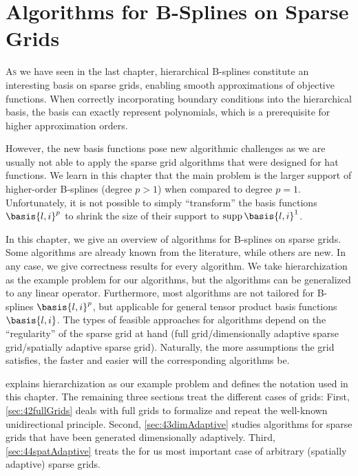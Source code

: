 
\chapter{Algorithms for B-Splines on Sparse Grids}



\lettrine{A}{s} we have seen in the last chapter,
hierarchical B-splines constitute an interesting basis on sparse grids,
enabling smooth approximations of objective functions.
When correctly incorporating boundary conditions into the hierarchical basis,
the basis can exactly represent polynomials,
which is a prerequisite for higher approximation orders.

However, the new basis functions pose new algorithmic challenges
as we are usually not able to apply the sparse grid algorithms
that were designed for hat functions.
We learn in this chapter that the main problem is the larger support
of higher-order B-splines (degree $p > 1$) when compared to degree $p = 1$.
Unfortunately, it is not possible to simply ``transform'' the basis
functions $\basis{l,i}^p$ to shrink the size of their support
to $\supp \basis{l,i}^1$.

In this chapter, we give an overview of algorithms for B-splines
on sparse grids.
Some algorithms are already known from the literature,
while others are new.
In any case, we give correctness results for every algorithm.
We take hierarchization as the example problem for our algorithms,
but the algorithms can be generalized to any linear operator.
Furthermore, most algorithms are not tailored for B-splines $\basis{l,i}^p$,
but applicable for general tensor product basis functions $\basis{l,i}$.
The types of feasible approaches for algorithms
depend on the ``regularity'' of the sparse grid at hand
(full grid/dimensionally adaptive sparse grid/spatially adaptive sparse grid).
Naturally, the more assumptions the grid satisfies, the faster and
easier will the corresponding algorithms be.

 explains hierarchization as our example problem
and defines the notation used in this chapter.
The remaining three sections treat the different cases of grids:
First, \cref{sec:42fullGrids} deals with full grids to formalize and repeat
the well-known unidirectional principle.
Second, \cref{sec:43dimAdaptive} studies algorithms for
sparse grids that have been generated dimensionally adaptively.
Third, \cref{sec:44spatAdaptive} treats the for us most important case
of arbitrary (spatially adaptive) sparse grids.

